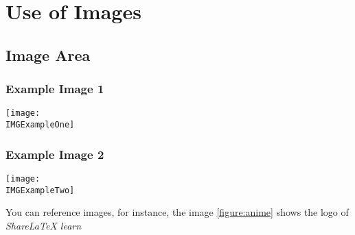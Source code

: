 \chapter{Use of Images}

\section{Image Area}
\subsection{Example Image 1}

\texttt{[image: \\IMGExampleOne]}

\subsection{Example Image 2}
  
\texttt{[image: \\IMGExampleTwo]}
\label{figure:anime}

You can reference images, for instance, the image \ref{figure:anime} shows 
the logo of \textit{ShareLaTeX learn}